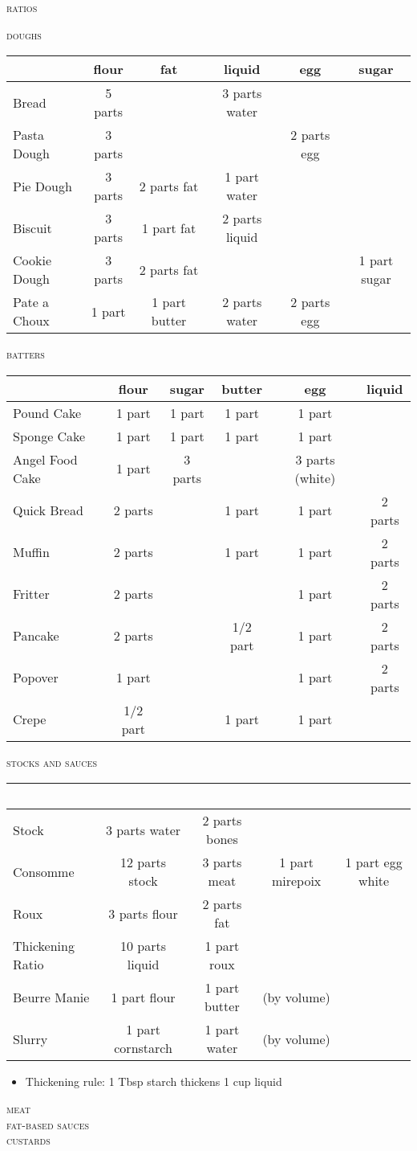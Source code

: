 \documentclass[letterpaper,11pt]{article}
\newcommand{\sectionheader}[1]{
    \vspace{1.2em}
    {\small\textsc{#1}} \\
}
\begin{document}
\normalsize

{\huge\scshape{ratios}}


\sectionheader{doughs}
\begin{tabular}{ l c c c c c }
\rowcolor{white}
~ & flour & fat & liquid & egg & sugar \\
\hline
Bread & 5 parts & & 3 parts water & & \\
Pasta Dough & 3 parts & & & 2 parts egg & \\
Pie Dough & 3 parts & 2 parts fat & 1 part water & & \\
Biscuit & 3 parts & 1 part fat & 2 parts liquid & & \\
Cookie Dough & 3 parts & 2 parts fat & & & 1 part sugar \\
Pate a Choux & 1 part & 1 part butter & 2 parts water & 2 parts egg & \\
\end{tabular}

\sectionheader{batters}
\begin{tabular}{ l c c c c c }
\rowcolor{white}
~ & flour & sugar & butter & egg & liquid \\
\hline
Pound Cake & 1 part & 1 part & 1 part & 1 part & \\
Sponge Cake & 1 part & 1 part & 1 part & 1 part & \\
Angel Food Cake & 1 part & 3 parts & & 3 parts (white) & \\
Quick Bread & 2 parts & & 1 part & 1 part & 2 parts \\
Muffin & 2 parts & & 1 part & 1 part & 2 parts \\
Fritter & 2 parts & & & 1 part & 2 parts \\
Pancake & 2 parts & & 1/2 part & 1 part & 2 parts \\
Popover & 1 part & & & 1 part & 2 parts \\
Crepe & 1/2 part & & 1 part & 1 part \\
\end{tabular}

\sectionheader{stocks and sauces}
\begin{tabular}{ l c c c c }
\rowcolor{white}
~ \\
\hline
Stock & 3 parts water & 2 parts bones & & \\
Consomme & 12 parts stock & 3 parts meat & 1 part mirepoix & 1 part egg white \\
Roux & 3 parts flour & 2 parts fat & & \\
Thickening Ratio & 10 parts liquid & 1 part roux & & \\
Beurre Manie & 1 part flour & 1 part butter & (by volume) & \\
Slurry & 1 part cornstarch & 1 part water & (by volume) & \\
\end{tabular}

\begin{itemize}
  \item Thickening rule: 1 Tbsp starch thickens 1 cup liquid
\end{itemize}

\sectionheader{meat}
\sectionheader{fat-based sauces}
\sectionheader{custards}
\end{document}
